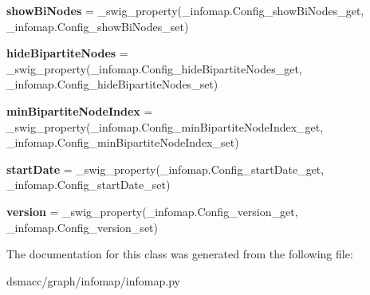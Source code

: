 \begin{DoxyCompactItemize}
{\bfseries show\+Bi\+Nodes} = \+\_\+swig\+\_\+property(\+\_\+infomap.\+Config\+\_\+show\+Bi\+Nodes\+\_\+get, \+\_\+infomap.\+Config\+\_\+show\+Bi\+Nodes\+\_\+set)
\item 
\mbox{\label{classdsmacc_1_1graph_1_1infomap_1_1infomap_1_1Config_a3682922ea1a04fcd298053fcce259c8d}} 
{\bfseries hide\+Bipartite\+Nodes} = \+\_\+swig\+\_\+property(\+\_\+infomap.\+Config\+\_\+hide\+Bipartite\+Nodes\+\_\+get, \+\_\+infomap.\+Config\+\_\+hide\+Bipartite\+Nodes\+\_\+set)
\item 
\mbox{\label{classdsmacc_1_1graph_1_1infomap_1_1infomap_1_1Config_aa12ec67f03825dd6819d365be378c4b8}} 
{\bfseries min\+Bipartite\+Node\+Index} = \+\_\+swig\+\_\+property(\+\_\+infomap.\+Config\+\_\+min\+Bipartite\+Node\+Index\+\_\+get, \+\_\+infomap.\+Config\+\_\+min\+Bipartite\+Node\+Index\+\_\+set)
\item 
\mbox{\label{classdsmacc_1_1graph_1_1infomap_1_1infomap_1_1Config_a9e658b246e7ce2bab06ad85c32f63f84}} 
{\bfseries start\+Date} = \+\_\+swig\+\_\+property(\+\_\+infomap.\+Config\+\_\+start\+Date\+\_\+get, \+\_\+infomap.\+Config\+\_\+start\+Date\+\_\+set)
\item 
\mbox{\label{classdsmacc_1_1graph_1_1infomap_1_1infomap_1_1Config_a43c15a1f61eb6784dde1bd9ced59131c}} 
{\bfseries version} = \+\_\+swig\+\_\+property(\+\_\+infomap.\+Config\+\_\+version\+\_\+get, \+\_\+infomap.\+Config\+\_\+version\+\_\+set)
\end{DoxyCompactItemize}


The documentation for this class was generated from the following file\+:\begin{DoxyCompactItemize}
\item 
dsmacc/graph/infomap/infomap.\+py\end{DoxyCompactItemize}
